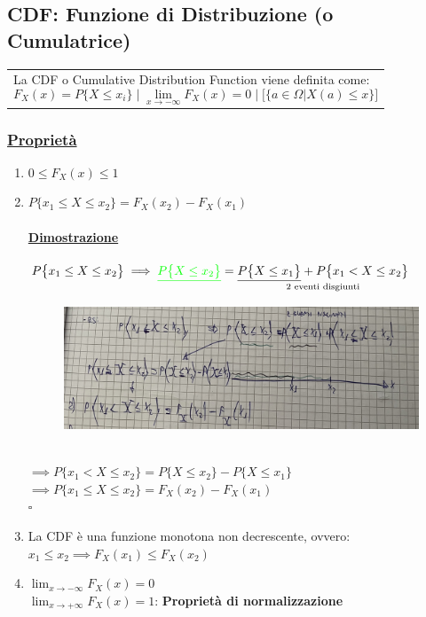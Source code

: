 \documentclass{article}
\begin{document}
\subsection{CDF: Funzione di Distribuzione (o Cumulatrice)}
\begin{tabular}{|p{13cm}}
La CDF o Cumulative Distribution Function viene definita come:
\[F_X(x) = P\big\{ X \leq x_i \big\} \;\big|\; \lim_{x \to -\infty} F_X(x) = 0  \;\big|\; \big[ \{a \in \Omega | X(a) \leq x\}\big]\]
\end{tabular}
\subsubsection{\underline{Proprietà}}
\begin{enumerate}
    \item $0 \leq F_X(x) \leq 1$
    \item $P \big\{ x_1 \leq X \leq x_2 \big\} = F_X(x_2) - F_X(x_1)$
    \newpage
    \paragraph{\underline{Dimostrazione}}
    $P \big\{ x_1 \leq X \leq x_2 \big\} \implies {\color{green}\underline{P \big\{ X \leq x_2 \big\}}} = \underset {\text{2 eventi disgiunti}}{\underline{P \big\{X \leq x_1 \big\}} + P \big\{ x_1 < X \leq x_2 \big\}}$ ~\\
    \begin{figure}[ht]
    \centering
    \includegraphics[scale=0.12]{images/27.prop2CDF.jpeg}
    \end{figure} ~\\
    $\implies P\big\{ x_1 < X \leq x_2 \big\} = P \big\{X \leq x_2\big\} - P \big\{ X \leq x_1\big\}$ \\
    $\implies P \big\{ x_1 \leq X \leq x_2 \big\} = F_X(x_2) - F_X(x_1)$ \\
    \hspace*{0pt}\hfill $\square$
    \item La CDF è una funzione monotona non decrescente, ovvero: $x_1 \leq x_2 \implies F_X(x_1) \leq F_X(x_2)$
    \item $\lim_{x \to -\infty} F_X(x) = 0$ \\
    $\lim_{x \to +\infty} F_X(x) = 1$: \textbf{Proprietà di normalizzazione}

\end{enumerate}
\end{document}
